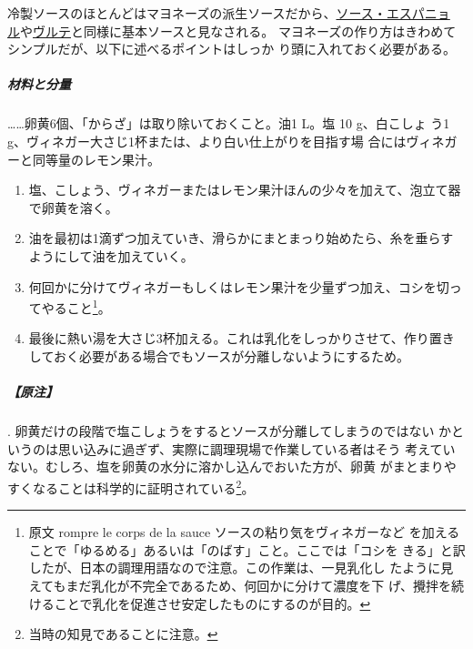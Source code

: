 \begin{recette}

冷製ソースのほとんどはマヨネーズの派生ソースだから、\protect\hyperlink{sauce-espagnole}{ソース・エスパニョ
ル}や\protect\hyperlink{veloute}{ヴルテ}と同様に基本ソースと見なされる。
マヨネーズの作り方はきわめてシンプルだが、以下に述べるポイントはしっか
り頭に入れておく必要がある。

\hypertarget{proportions-mayonnaise}{%
\subparagraph{材料と分量}\label{proportions-mayonnaise}}

\ldots{}\ldots{}卵黄6個、「からざ」は取り除いておくこと。油1 L。塩 10
g、白こしょ う1
g、ヴィネガー大さじ1\undemi{}杯または、より白い仕上がりを目指す場
合にはヴィネガーと同等量のレモン果汁。

\begin{enumerate}
\def\labelenumi{\arabic{enumi}.}
\item
  塩、こしょう、ヴィネガーまたはレモン果汁ほんの少々を加えて、泡立て器で卵黄を溶く。
\item
  油を最初は1滴ずつ加えていき、滑らかにまとまっり始めたら、糸を垂らすようにして油を加えていく。
\item
  何回かに分けてヴィネガーもしくはレモン果汁を少量ずつ加え、コシを切ってやること\footnote{原文
    rompre le corps de la sauce ソースの粘り気をヴィネガーなど
    を加えることで「ゆるめる」あるいは「のばす」こと。ここでは「コシを
    きる」と訳したが、日本の調理用語なので注意。この作業は、一見乳化し
    たように見えてもまだ乳化が不完全であるため、何回かに分けて濃度を下
    げ、攪拌を続けることで乳化を促進させ安定したものにするのが目的。}。
\item
  最後に熱い湯を大さじ3杯加える。これは乳化をしっかりさせて、作り置きしておく必要がある場合でもソースが分離しないようにするため。
\end{enumerate}

\hypertarget{nota-mayonnaise}{%
\subparagraph{【原注】}\label{nota-mayonnaise}}

.
卵黄だけの段階で塩こしょうをするとソースが分離してしまうのではない
かというのは思い込みに過ぎず、実際に調理現場で作業している者はそう
考えていない。むしろ、塩を卵黄の水分に溶かし込んでおいた方が、卵黄
がまとまりやすくなることは科学的に証明されている\footnote{当時の知見であることに注意。}。


\end{recette}
